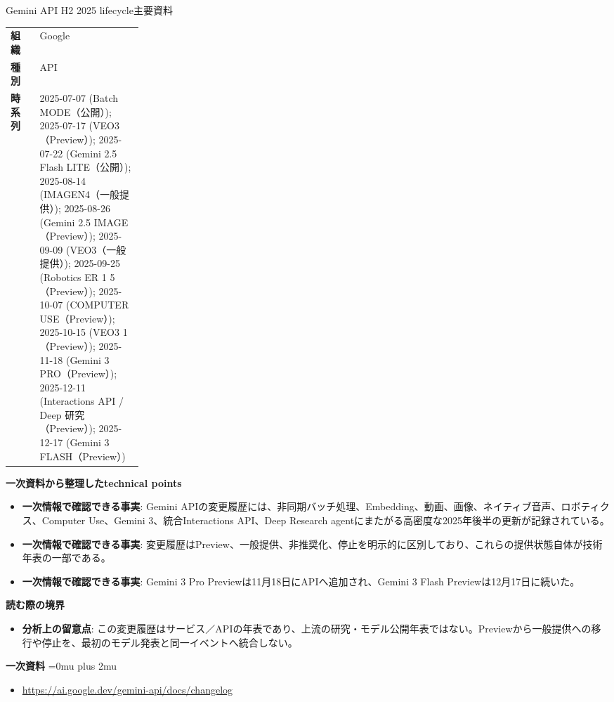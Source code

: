 \begin{technicalnote}{Gemini API H2 2025 lifecycle}{主要資料}
\begingroup
\begin{tabularx}{\linewidth}{@{}>{\bfseries}p{0.22\linewidth}X@{}}
組織 & Google \\
種別 & API \\
時系列 & 2025-07-07 (Batch MODE（公開）); 2025-07-17 (VEO3（Preview）); 2025-07-22 (Gemini 2.5 Flash LITE（公開）); 2025-08-14 (IMAGEN4（一般提供）); 2025-08-26 (Gemini 2.5 IMAGE（Preview）); 2025-09-09 (VEO3（一般提供）); 2025-09-25 (Robotics ER 1 5（Preview）); 2025-10-07 (COMPUTER USE（Preview）); 2025-10-15 (VEO3 1（Preview）); 2025-11-18 (Gemini 3 PRO（Preview）); 2025-12-11 (Interactions API / Deep 研究（Preview）); 2025-12-17 (Gemini 3 FLASH（Preview）) \\
\end{tabularx}
\smallskip
{\bfseries 一次資料から整理したtechnical points}
\begin{itemize}[leftmargin=1.5em,itemsep=0.35em]
\item \textbf{一次情報で確認できる事実}: Gemini APIの変更履歴には、非同期バッチ処理、Embedding、動画、画像、ネイティブ音声、ロボティクス、Computer Use、Gemini 3、統合Interactions API、Deep Research agentにまたがる高密度な2025年後半の更新が記録されている。
\item \textbf{一次情報で確認できる事実}: 変更履歴はPreview、一般提供、非推奨化、停止を明示的に区別しており、これらの提供状態自体が技術年表の一部である。
\item \textbf{一次情報で確認できる事実}: Gemini 3 Pro Previewは11月18日にAPIへ追加され、Gemini 3 Flash Previewは12月17日に続いた。
\end{itemize}
\begin{minipage}{\linewidth}
{\bfseries 読む際の境界}
\begin{itemize}[leftmargin=1.5em,itemsep=0.35em]
\item \textbf{分析上の留意点}: この変更履歴はサービス／APIの年表であり、上流の研究・モデル公開年表ではない。Previewから一般提供への移行や停止を、最初のモデル発表と同一イベントへ統合しない。
\end{itemize}
\begin{samepage}
{\bfseries 一次資料}
\begingroup\sloppy
\Urlmuskip=0mu plus 2mu\relax
\begin{itemize}[leftmargin=1.5em,itemsep=0.25em]
\item {\scriptsize\url{https://ai.google.dev/gemini-api/docs/changelog}}
\end{itemize}
\endgroup
\end{samepage}
\end{minipage}
\endgroup
\end{technicalnote}
\medskip

